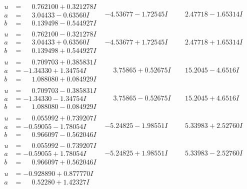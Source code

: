 \documentclass[1p]{elsarticle_modified}
\theoremstyle{definition}
\begin{document}
$$\begin{array}{c|c|c}
\begin{aligned}
u &= \phantom{-}0.762100 + 0.321278 I \\
a &= \phantom{-}3.04433 - 0.63560 I \\
b &= \phantom{-}0.139498 - 0.544927 I\end{aligned}
 & -4.53677 - 1.72545 I & \phantom{-}2.47718 - 1.65314 I \\ \hline\begin{aligned}
u &= \phantom{-}0.762100 - 0.321278 I \\
a &= \phantom{-}3.04433 + 0.63560 I \\
b &= \phantom{-}0.139498 + 0.544927 I\end{aligned}
 & -4.53677 + 1.72545 I & \phantom{-}2.47718 + 1.65314 I \\ \hline\begin{aligned}
u &= \phantom{-}0.709703 + 0.385831 I \\
a &= -1.34330 + 1.34754 I \\
b &= \phantom{-}1.088080 + 0.084929 I\end{aligned}
 & \phantom{-}3.75865 + 0.52675 I & \phantom{-}15.2045 - 4.6516 I \\ \hline\begin{aligned}
u &= \phantom{-}0.709703 - 0.385831 I \\
a &= -1.34330 - 1.34754 I \\
b &= \phantom{-}1.088080 - 0.084929 I\end{aligned}
 & \phantom{-}3.75865 - 0.52675 I & \phantom{-}15.2045 + 4.6516 I \\ \hline\begin{aligned}
u &= \phantom{-}0.055992 + 0.739207 I \\
a &= -0.59055 - 1.78054 I \\
b &= \phantom{-}0.966097 - 0.562046 I\end{aligned}
 & -5.24825 - 1.98551 I & \phantom{-}5.33983 + 2.52760 I \\ \hline\begin{aligned}
u &= \phantom{-}0.055992 - 0.739207 I \\
a &= -0.59055 + 1.78054 I \\
b &= \phantom{-}0.966097 + 0.562046 I\end{aligned}
 & -5.24825 + 1.98551 I & \phantom{-}5.33983 - 2.52760 I \\ \hline\begin{aligned}
u &= -0.928890 + 0.877770 I \\
a &= \phantom{-}0.52280 + 1.42327 I \\

\end{aligned}
\end{array}$$
\end{document}
